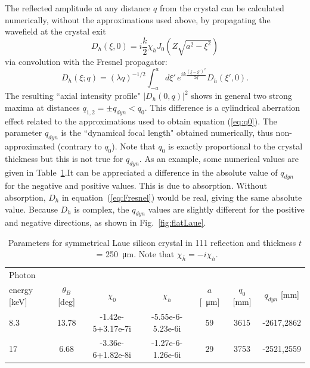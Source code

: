 \documentclass[preprint]{iucr}              %
\begin{document}
The reflected amplitude at any distance $q$ from the crystal can be calculated numerically, without the approximations used above, by propagating the wavefield at the crystal exit
\begin{equation}
    D_h(\xi,0)=i \frac{k}{2}\chi_h J_0(Z\sqrt{a^2-\xi^2})
\end{equation}
via convolution with the Fresnel propagator:
\begin{equation}
\label{eq:Fresnel}
    D_h(\xi; q) = (\lambda q)^{-1/2} \int_{-a}^a d\xi'  \, e^{i k 
    \frac{(\xi-\xi')^2}{2 q}} 
    D_h(\xi',0).
\end{equation}
The resulting ``axial intensity profile" $|D_h(0,q)|^2$ shows in general two strong maxima at distances $q_{1,2}=\pm q_{dyn} < q_0$. This difference is a cylindrical aberration effect related to the approximations used to obtain equation (\ref{eq:q0}). The parameter $q_{dyn}$ is the ``dynamical focal length" obtained numerically, thus non-approximated (contrary to $q_0$). Note that $q_0$ is exactly proportional to the crystal thickness but this is not true for $q_{dyn}$. As an example, some numerical values are given in Table~\ref{table:example}.It can be appreciated a difference in the absolute value of $q_{dyn}$ for the negative and positive values. This is due to absorption. Without absorption, $D_h$ in equation~(\ref{eq:Fresnel}) would be real, giving the same absolute value. Because $D_h$ is complex, the $q_{dyn}$ values are slightly different for the positive and negative directions, as shown in Fig.~\ref{fig:flatLaue}.

\begin{table}
\caption{Parameters for symmetrical Laue silicon crystal in 111 reflection and thickness $t$~= \SI{250}{\micro\meter}. Note that $\chi_{\bar h}=-i\chi_h$.}
\begin{tabular}{lcccccc}
 Photon \\energy  [keV]  & $\theta_B$ [deg]       & $\chi_0$ & $\chi_h$ & $a$ [\SI{}{\micro\meter}]& $q_0$ [mm] & $q_{dyn}$  [mm] \\
\hline
 8.3  &  13.78 & -1.42e-5+3.17e-7i & -5.55e-6-5.23e-6i  & 59  & 3615  & -2617,2862   \\
 17   &  6.68 & -3.36e-6+1.82e-8i & -1.27e-6-1.26e-6i  & 29  & 3753  & -2521,2559 
\end{tabular}
\label{table:example}
\end{table}
\end{document}
